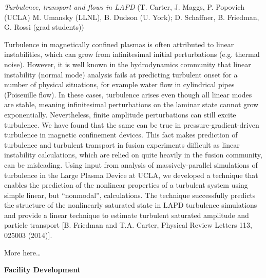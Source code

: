 \documentclass[11pt]{article}
\begin{document}
\begin{description}
\emph{Turbulence, transport and flows in LAPD} (T. Carter, J. Maggs, P.
Popovich (UCLA) M. Umansky (LLNL), B. Dudson (U. York); D. Schaffner, B.
Friedman, G. Rossi (grad students))

Turbulence in magnetically confined plasmas is often attributed to
linear instabilities, which can grow from infinitesimal initial
perturbations (e.g. thermal noise). However, it is well known in the
hydrodynamics community that linear instability (normal mode) analysis
fails at predicting turbulent onset for a number of physical situations,
for example water flow in cylindrical pipes (Poiseuille flow). In these
cases, turbulence arises even though all linear modes are stable,
meaning infinitesimal perturbations on the laminar state cannot grow
exponentially. Nevertheless, finite amplitude perturbations can still
excite turbulence. We have found that the same can be true in
pressure-gradient-driven turbulence in magnetic confinement devices.
This fact makes prediction of turbulence and turbulent transport in
fusion experiments difficult as linear instability calculations, which
are relied on quite heavily in the fusion community, can be misleading.
Using input from analysis of massively-parallel simulations of
turbulence in the Large Plasma Device at UCLA, we developed a technique
that enables the prediction of the nonlinear properties of a turbulent
system using simple linear, but ``nonmodal'', calculations. The
technique successfully predicts the structure of the nonlinearly
saturated state in LAPD turbulence simulations and provide a linear
technique to estimate turbulent saturated amplitude and particle
transport {[}B. Friedman and T.A. Carter, Physical Review Letters 113,
025003 (2014){]}.

More here\ldots{}


\textbf{Facility Development}


\end{description}
\end{document}
